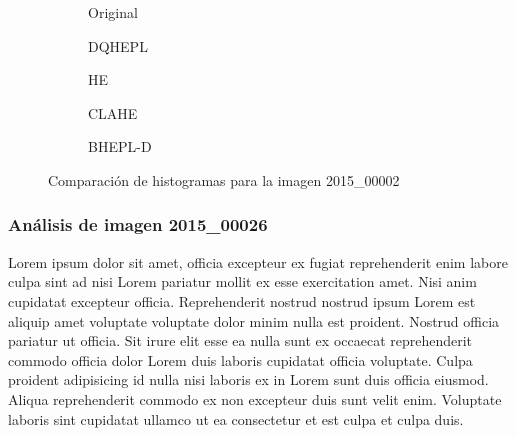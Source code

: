 \documentclass[sigchi]{acmart}
\begin{document}
\begin{figure}[H]
	\centering

	\begin{subfigure}[b]{0.45\textwidth}
		\resizebox{\linewidth}{!}{}
		\caption{Original}
		\label{fig:original_1}
	\end{subfigure}
	\hfill
	\begin{subfigure}[b]{0.45\textwidth}
		\resizebox{\linewidth}{!}{}
		\caption{DQHEPL}
		\label{fig:dqhepl_1}
	\end{subfigure}

	\vspace{5mm}

	\begin{subfigure}[b]{0.45\textwidth}
		\resizebox{\linewidth}{!}{}
		\caption{HE}
		\label{fig:he_1}
	\end{subfigure}
	\hfill
	\begin{subfigure}[b]{0.45\textwidth}
		\resizebox{\linewidth}{!}{}
		\caption{CLAHE}
		\label{fig:clahe_1}
	\end{subfigure}

	\vspace{5mm}
	\centering
	\begin{subfigure}[b]{0.45\textwidth}
		\resizebox{\linewidth}{!}{}
		\caption{BHEPL-D}
		\label{fig:bhepl_1}
	\end{subfigure}

	\caption{Comparación de histogramas para la imagen 2015\_00002}
	\label{fig:histogramas_1}
\end{figure}

\subsubsection{Análisis de imagen 2015\_00026}

Lorem ipsum dolor sit amet, officia excepteur ex fugiat reprehenderit enim labore culpa sint ad
nisi Lorem pariatur mollit ex esse exercitation amet. Nisi anim cupidatat excepteur officia.
Reprehenderit nostrud nostrud ipsum Lorem est aliquip amet voluptate voluptate dolor minim
nulla est proident. Nostrud officia pariatur ut officia. Sit irure elit esse ea nulla sunt ex
occaecat reprehenderit commodo officia dolor Lorem duis laboris cupidatat officia voluptate.
Culpa proident adipisicing id nulla nisi laboris ex in Lorem sunt duis officia eiusmod. Aliqua
reprehenderit commodo ex non excepteur duis sunt velit enim. Voluptate laboris sint cupidatat
ullamco ut ea consectetur et est culpa et culpa duis.
\end{document}

